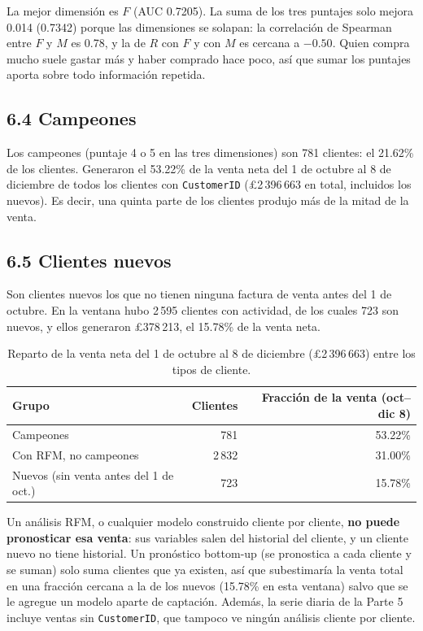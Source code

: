 \documentclass[11pt]{article}
\begin{document}
La mejor dimensión es $F$ (AUC 0.7205). La suma de los tres puntajes solo mejora 0.014 (0.7342) porque las dimensiones se solapan: la correlación de Spearman entre $F$ y $M$ es 0.78, y la de $R$ con $F$ y con $M$ es cercana a $-0.50$. Quien compra mucho suele gastar más y haber comprado hace poco, así que sumar los puntajes aporta sobre todo información repetida.

\subsection*{6.4 Campeones}
Los campeones (puntaje 4 o 5 en las tres dimensiones) son 781 clientes: el 21.62\% de los clientes. Generaron el 53.22\% de la venta neta del 1 de octubre al 8 de diciembre de todos los clientes con \texttt{CustomerID} (\pounds{}2\,396\,663 en total, incluidos los nuevos). Es decir, una quinta parte de los clientes produjo más de la mitad de la venta.

\subsection*{6.5 Clientes nuevos}
Son clientes nuevos los que no tienen ninguna factura de venta antes del 1 de octubre. En la ventana hubo 2\,595 clientes con actividad, de los cuales 723 son nuevos, y ellos generaron \pounds{}378\,213, el 15.78\% de la venta neta.

\begin{table}[H]
\centering
\begin{tabular}{l|rr}
\hline
Grupo & Clientes & Fracción de la venta (oct--dic 8) \\
\hline
Campeones & 781 & 53.22\% \\
Con RFM, no campeones & 2\,832 & 31.00\% \\
Nuevos (sin venta antes del 1 de oct.) & 723 & 15.78\% \\
\hline
\end{tabular}
\caption{Reparto de la venta neta del 1 de octubre al 8 de diciembre (\pounds{}2\,396\,663) entre los tipos de cliente.}
\label{tab:p6resumen}
\end{table}

Un análisis RFM, o cualquier modelo construido cliente por cliente, \textbf{no puede pronosticar esa venta}: sus variables salen del historial del cliente, y un cliente nuevo no tiene historial. Un pronóstico bottom-up (se pronostica a cada cliente y se suman) solo suma clientes que ya existen, así que subestimaría la venta total en una fracción cercana a la de los nuevos (15.78\% en esta ventana) salvo que se le agregue un modelo aparte de captación. Además, la serie diaria de la Parte 5 incluye ventas sin \texttt{CustomerID}, que tampoco ve ningún análisis cliente por cliente.
\end{document}
